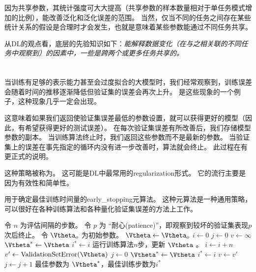 因为共享参数，其统计强度可大大提高（共享参数的样本数量相对于单任务模式增加的比例），能改善泛化和泛化误差的范围\citep{baxter95a}。
当然，仅当不同的任务之间存在某些统计关系的假设是合理时才会发生，也就是意味着某些参数能通过不同任务共享。

从\gls{DL}的观点看，底层的先验知识如下：\emph{能解释数据变化（在与之相关联的不同任务中观察到）的因素中，一些是跨两个或更多任务共享的。}


\section{}
\label{sec:early_stopping}
当训练有足够的表示能力甚至会过度拟合的大模型时，我们经常观察到，训练误差会随着时间的推移逐渐降低但验证集的误差会再次上升。
是这些现象的一个例子，这种现象几乎一定会出现。

这意味着如果我们返回使验证集误差最低的参数设置，就可以获得更好的模型（因此，有希望获得更好的测试误差）。
在每次验证集误差有所改善后，我们存储模型参数的副本。
当训练算法终止时，我们返回这些参数而不是最新的参数。
当验证集上的误差在事先指定的循环内没有进一步改善时，算法就会终止。
此过程在有更正式的说明。



这种策略被称为。
这可能是\gls{DL}中最常用的\gls{regularization}形式。
它的流行主要是因为有效性和简单性。

\begin{algorithm}[ht]
\caption{用于确定最佳训练时间量的\gls{early_stopping}元算法。
这种元算法是一种通用策略，可以很好在各种训练算法和各种量化验证集误差的方法上工作。
}
\label{alg:early_stopping}
\begin{algorithmic}
\STATE 令 $n$ 为评估间隔的步数。
\STATE 令 $p$ 为 ``耐心(patience)''，即观察到较坏的验证集表现$p$次后终止。 
\STATE 令 $\Vtheta_{o}$ 为初始参数。
\STATE $\Vtheta \leftarrow \Vtheta_{o}$
\STATE $i \leftarrow 0$
\STATE $j \leftarrow 0$
\STATE $v \leftarrow \infty$
\STATE $\Vtheta^* \leftarrow \Vtheta$
\STATE $i^* \leftarrow i$
    \STATE 运行训练算法$n$步，更新 $\Vtheta$ 。
    \STATE $i \leftarrow i + n$
    \STATE $v' \leftarrow \text{ValidationSetError}(\Vtheta)$
        \STATE $j \leftarrow 0$
        \STATE $\Vtheta^* \leftarrow \Vtheta$
        \STATE $i^* \leftarrow i$
        \STATE $v \leftarrow v'$
    \ELSE
        \STATE $j \leftarrow j + 1$
    \ENDIF
\ENDWHILE
\STATE 最佳参数为 $\Vtheta^*$，最佳训练步数为$i^*$
\end{algorithmic}
\end{algorithm}


